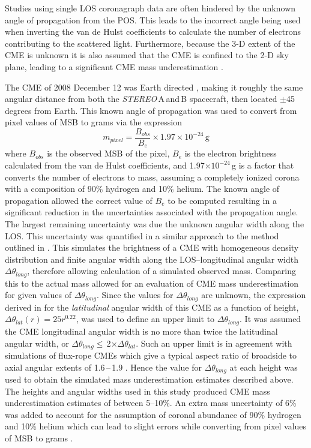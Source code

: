 \documentclass{emulateapj}
\begin{document}
Studies using single LOS coronagraph data are often hindered by the unknown angle of propagation from the POS. This leads to the incorrect angle being used when inverting the van de Hulst coefficients to calculate the number of electrons contributing to the scattered light. Furthermore, because the 3-D extent of the CME is unknown it is also assumed that the CME is confined to the 2-D sky plane, leading to a significant CME mass underestimation \citep{vou00}.

The CME of 2008 December 12 was Earth directed \citep{byr10}, making it roughly the same angular distance from both the \emph{STEREO}\,A\,and\,B spacecraft, then located $\pm$45 degrees from Earth. This known angle of propagation was used to convert from pixel values of MSB to grams via the expression
\begin{equation}
m_{pixel}=\frac{B_{obs}}{B_{e}}\times1.97\times10^{-24}\,\mathrm{g}
\end{equation}
where $B_{obs}$ is the observed MSB of the pixel, $B_{e}$ is the electron brightness calculated from the van de Hulst coefficients, and 1.97$\times10^{-24}$\,g is a factor that converts the number of electrons to mass, assuming a completely ionized corona with a composition of 90\% hydrogen and 10\% helium. The known angle of propagation allowed the correct value of $B_{e}$ to be computed resulting in a significant reduction in the uncertainties associated with the propagation angle. The largest remaining uncertainty was due the unknown angular width along the LOS. This uncertainty was quantified in a similar approach to the method outlined in \citet{vou00}. This simulates the brightness of a CME with homogeneous density distribution and finite angular width along the LOS--longitudinal angular width $\Delta$$\theta_{long}$, therefore allowing calculation of a simulated observed mass. Comparing this to the actual mass allowed for an evaluation of CME mass underestimation for given values of $\Delta$$\theta_{long}$.  Since the values for $\Delta$$\theta_{long}$ are unknown, the expression derived in \citet{byr10} for the \emph{latitudinal} angular width of this CME as a function of height, $\Delta$$\theta_{lat}$$(r)=25r^{0.22}$, was used to define an upper limit to $\Delta$$\theta_{long}$. It was assumed the CME longitudinal angular width is no more than twice the latitudinal angular width, or $\Delta$$\theta_{long}$$\leqslant$\,2$\times$$\Delta$$\theta_{lat}$. Such an upper limit is in agreement with simulations of flux-rope CMEs which give a typical aspect ratio of broadside to axial angular extents of 1.6\,--\,1.9 \citep{krall2006}. Hence the value for $\Delta$$\theta_{long}$ at each height was used to obtain the simulated mass underestimation estimates described above. The heights and angular widths used in this study produced CME mass underestimation estimates of between 5--10\%. An extra mass uncertainty of 6\% was added to account for the assumption of coronal abundance of 90\% hydrogen and 10\% helium which can lead to slight errors while converting from pixel values of MSB to grams \citep{vour2010}. 
\end{document}

